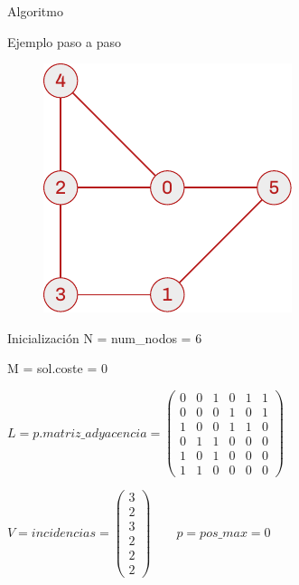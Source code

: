 \documentclass[spanish]{beamer}
\begin{document}
\begin{frame}{Algoritmo}
	
\end{frame}

\begin{frame}{Ejemplo paso a paso}
	\begin{figure}[H]
		\centering \includegraphics{./img/grafo-ejemplo-sin-recubrir-pres.pdf}
	\end{figure}

\end{frame}

\begin{frame}{Inicialización}
	N = num\_nodos = 6

	M = sol.coste = 0


	$\displaystyle  L = p.matriz\_adyacencia =
\begin{pmatrix}
  0 & 0 & 1 & 0 & 1 & 1 \\
  0 & 0 & 0 & 1 & 0 & 1 \\
  1 & 0 & 0 & 1 & 1 & 0 \\
  0 & 1 & 1 & 0 & 0 & 0 \\
  1 & 0 & 1 & 0 & 0 & 0 \\
  1 & 1 & 0 & 0 & 0 & 0
\end{pmatrix}$

	$\displaystyle  V = incidencias =
\begin{pmatrix}
  3 \\
  2 \\
  3 \\
  2 \\
  2 \\
  2
\end{pmatrix} \hspace{2em} p = pos\_max = 0$

\end{frame}
\end{document}
